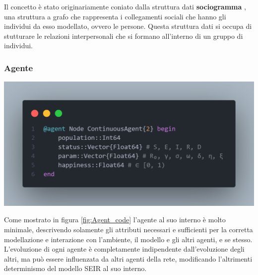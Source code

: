 Il concetto è stato originariamente coniato dalla struttura dati \textbf{sociogramma} \cite{wiki:Sociogram}, 
una struttura a grafo che rappresenta i collegamenti sociali che hanno gli individui da esso modellato, ovvero le persone. 
Questa struttura dati si occupa di stutturare le relazioni interpersonali che si formano all'interno di un 
gruppo di individui. 

\subsubsection{Agente}

\begin{minipage}{\linewidth}
    \centering
    \includegraphics[width=\textwidth]{img/node_agent.png}
    \label{fig:Agent_code}
\end{minipage}

Come mostrato in figura \ref{fig:Agent_code} l'agente al suo interno è molto minimale,
descrivendo solamente gli attributi necessari e sufficienti per la corretta modellazione
e interazione con l'ambiente, il modello e gli altri agenti, e se stesso. L'evoluzione di 
ogni agente è completamente indipendente dall'evoluzione degli altri, ma può essere influenzata da 
altri agenti della rete, modificando l'altrimenti determinismo del modello SEIR al suo interno. 

